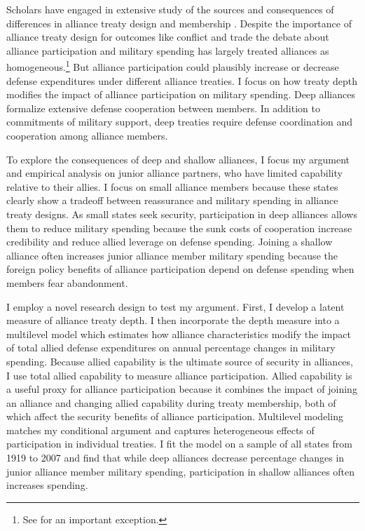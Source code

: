 \documentclass[12pt]{article}
\begin{document}
Scholars have engaged in extensive study of the sources and consequences of differences in alliance treaty design and membership \citep{Mattes2012, Benson2012, Poast2019a, Morrow1991, Leeds2003, LeedsAnac2005, Fordham2010, Mattes2012,  Poast2013, Johnsonetal2015}. 
Despite the importance of alliance treaty design for outcomes like conflict \citep{Leeds2003, Benson2012} and trade \citep{Long2003, LongLeeds2006} the debate about alliance participation and military spending has largely treated alliances as homogeneous.\footnote{See \citet{DigiuseppePoast2016} for an important exception.}
But alliance participation could plausibly increase or decrease defense expenditures under different alliance treaties. 
I focus on how treaty depth modifies the impact of alliance participation on military spending. 
Deep alliances formalize extensive defense cooperation between members. 
In addition to commitments of military support, deep treaties require defense coordination and cooperation among alliance members. 


To explore the consequences of deep and shallow alliances, I focus my argument and empirical analysis on junior alliance partners, who have limited capability relative to their allies. 
I focus on small alliance members because these states clearly show a tradeoff between reassurance and military spending in alliance treaty designs.
As small states seek security, participation in deep alliances allows them to reduce military spending because the sunk costs of cooperation increase credibility and reduce allied leverage on defense spending. 
Joining a shallow alliance often increases junior alliance member military spending because the foreign policy benefits of alliance participation depend on defense spending when members fear abandonment.

 
I employ a novel research design to test my argument.
First, I develop a latent measure of alliance treaty depth. 
I then incorporate the depth measure into a multilevel model which estimates how alliance characteristics modify the impact of total allied defense expenditures on annual percentage changes in military spending.
Because allied capability is the ultimate source of security in alliances, I use total allied capability to measure alliance participation.  
Allied capability is a useful proxy for alliance participation because it combines the impact of joining an alliance and changing allied capability during treaty membership, both of which affect the security benefits of alliance participation. 
Multilevel modeling matches my conditional argument and captures heterogeneous effects of participation in individual treaties. 
I fit the model on a sample of all states from 1919 to 2007 and find that while deep alliances decrease percentage changes in junior alliance member military spending, participation in shallow alliances often increases spending.
\end{document}
